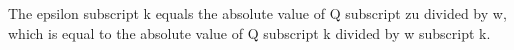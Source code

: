 The epsilon subscript k equals the absolute value of Q subscript zu divided by w, which is equal to the absolute value of Q subscript k divided by w subscript k.